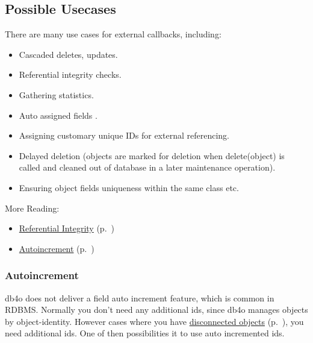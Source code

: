 \subsection{Possible Usecases}
\label{ref:advanced-topics-callbacks-possible-usecases}

There are many use cases for external callbacks, including:

\begin{itemize}
\item Cascaded deletes, updates.
\item Referential integrity checks.
\item Gathering statistics.
\item Auto assigned fields .
\item Assigning customary unique IDs for external referencing.
\item Delayed deletion (objects are marked for deletion when delete(object) is called and cleaned out of database in a later maintenance operation).
\item Ensuring object fields uniqueness within the same class etc.
\end{itemize}

More Reading:

\begin{itemize}
\item \hyperref[ref:advanced-topics-callbacks-possible-usecases-referential-integrity]{Referential Integrity} (p.~\pageref{ref:advanced-topics-callbacks-possible-usecases-referential-integrity})
\item \hyperref[ref:advanced-topics-callbacks-possible-usecases-autoincrement]{Autoincrement} (p.~\pageref{ref:advanced-topics-callbacks-possible-usecases-autoincrement})
\end{itemize}

\subsubsection{Autoincrement}
\label{ref:advanced-topics-callbacks-possible-usecases-autoincrement}

db4o does not deliver a field auto increment feature, which is common in RDBMS. Normally you don't need any additional ids, since db4o manages objects by object-identity. However cases where you have \hyperref[ref:platform-specific-issues-disconnected-objects]{disconnected objects} (p.~\pageref{ref:platform-specific-issues-disconnected-objects}), you need additional ids. One of then possibilities it to use auto incremented ids.


